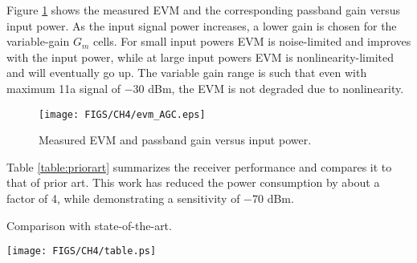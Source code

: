 Figure \ref{fig:evmpin} shows the measured EVM and the corresponding passband gain versus input power. As the input signal power increases, a lower gain
is chosen for the variable-gain $G_m$ cells. For small input powers EVM is noise-limited and improves with the input power, while at large input powers
EVM is nonlinearity-limited and will eventually go up. The variable gain range is such that even with maximum 11a signal of $-$30 dBm, the EVM is not
degraded due to nonlinearity.
\begin{figure}[htb!]
\centering
\texttt{[image: FIGS/CH4/evm\_AGC.eps]}
\caption{Measured EVM and passband gain versus input power.}
\label{fig:evmpin}
\end{figure}

Table \ref{table:priorart} summarizes the receiver performance and compares it to that of prior art. This work has reduced the power consumption by about a factor of 4,
while demonstrating a sensitivity of $-$70 dBm. 
\begin{table}[htb]
\caption{Comparison with state-of-the-art.}
\vspace{0.1in}
\centering
\texttt{[image: FIGS/CH4/table.ps]}
\label{table:priorart}
\end{table}

